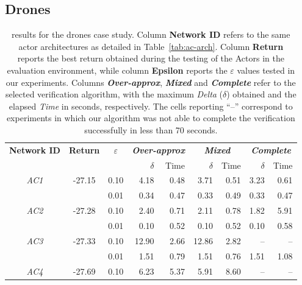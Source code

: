 \subsection{Drones}
%
\begin{table}[t]
	\caption{\label{tab:exp-res}\nevertwo{} results for the drones case study.
		Column \textbf{Network ID} refers to the same actor architectures as
		detailed in Table~\ref{tab:ac-arch}. Column \textbf{Return} reports the 
		best return obtained during the testing of the Actors in the evaluation
		environment, while column \textbf{Epsilon} reports the $\varepsilon$ 
		values tested in our experiments. Columns \textit{\textbf{Over-approx}}, 
		\textit{\textbf{Mixed}} and \textit{\textbf{Complete}} refer to the 
		selected verification algorithm, with the maximum \textit{Delta} 
		($\delta$) obtained and the elapsed \textit{Time} in seconds, respectively. 
		The cells reporting ``--'' correspond to experiments in which our algorithm 
		was not able to complete the verification successfully in less than 
		70 seconds.}
	\setlength{\tabcolsep}{9pt}
	\centering
	\begin{tabular}{c c c rr rr rr}
		\toprule
		\multirow{2}{*}{\textbf{Network ID}} & 
		\multirow{2}{*}{\textbf{Return}} & 
		\multirow{2}{*}{\textbf{$\varepsilon$}} & 
		\multicolumn{2}{c}{\textbf{\textit{Over-approx}}} &
		\multicolumn{2}{c}{\textbf{\textit{Mixed}}} &
		\multicolumn{2}{c}{\textbf{\textit{Complete}}} \\
		\cmidrule{4-9}
		& & & $\delta$ & Time & $\delta$ & Time & $\delta$ & Time \\
		\midrule
		\multirow{2}{*}{\textit{AC1}} & \multirow{2}{*}{-27.15} &
		0.10 & 4.18 & 0.48 & 3.71 & 0.51 & 3.23 & 0.61 \\
		& & 0.01 & 0.34 & 0.47 & 0.33 & 0.49 & 0.33 & 0.47 \\
		\multirow{2}{*}{\textit{AC2}} & \multirow{2}{*}{-27.28} &
		0.10 & 2.40 & 0.71 & 2.11 & 0.78 & 1.82 & 5.91 \\
		& & 0.01 & 0.10 & 0.52 & 0.10 & 0.52 & 0.10 & 0.58 \\
		\multirow{2}{*}{\textit{AC3}} & \multirow{2}{*}{-27.33} &
		0.10 & 12.90 & 2.66 & 12.86 & 2.82 & -- & -- \\
		& & 0.01 & 1.51 & 0.79 & 1.51 & 0.76 & 1.51 & 1.08 \\
		\multirow{2}{*}{\textit{AC4}} & \multirow{2}{*}{-27.69} &
		0.10 & 6.23 & 5.37 & 5.91 & 8.60 & -- & -- \\

\end{tabular}
\end{table}
